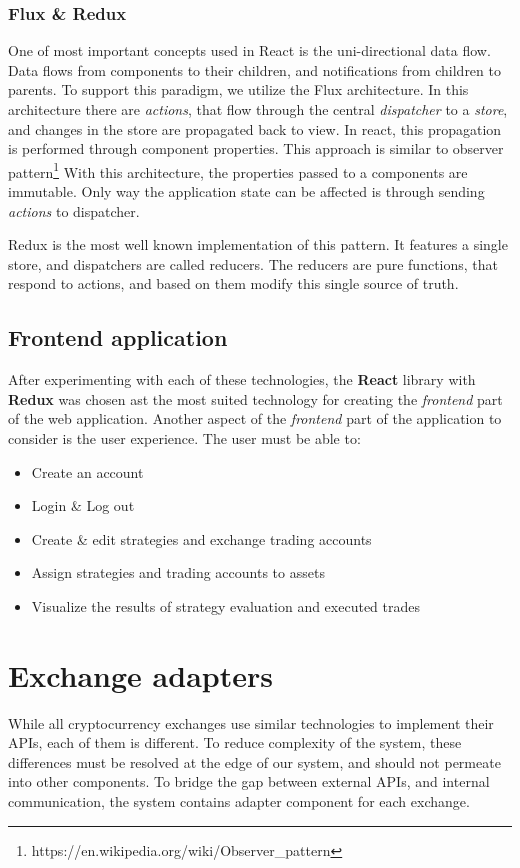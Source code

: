 \subsubsection{Flux \& Redux}
One of most important concepts used in React is the uni-directional data flow. Data flows
from components to their children, and notifications from children to parents.
To support this paradigm, we utilize the Flux architecture. In this architecture there are \textit{actions}, that flow through the
central \textit{dispatcher} to a \textit{store}, and changes in the store are propagated back to view. In react,
this propagation is performed through component properties. This approach is similar to observer pattern\footnote{https://en.wikipedia.org/wiki/Observer\_pattern}
With this architecture, the properties passed to a components are immutable. Only way the application state can be affected is
through sending \textit{actions} to dispatcher.

Redux is the most well known implementation of this pattern. It features a single store, and dispatchers are
called reducers. The reducers are pure functions, that respond to actions, and based on them modify this single source of truth.


\subsection{Frontend application}
After experimenting with each of these technologies, the \textbf{React} library with \textbf{Redux} was chosen ast the most suited technology for creating the \textit{frontend}
part of the web application.
Another aspect of the \textit{frontend} part of the application to consider is the user experience. The user
must be able to:
\begin{itemize}
    \item Create an account
    \item Login \& Log out
    \item Create \& edit strategies and exchange trading accounts
    \item Assign strategies and trading accounts to assets
    \item Visualize the results of strategy evaluation and executed trades
\end{itemize}

\section{Exchange adapters}
While all cryptocurrency exchanges use similar technologies to implement their APIs, each of them is different. To reduce
complexity of the system, these differences must be resolved at the edge of our system, and should not permeate into other
components. To bridge the gap between external APIs, and internal communication, the system contains adapter component
for each exchange.


